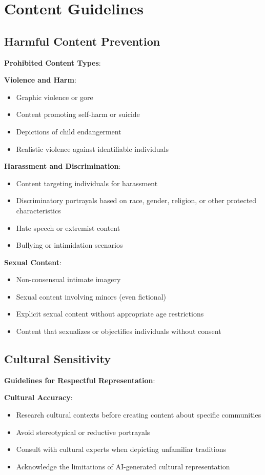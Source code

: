 \section{Content Guidelines}

\subsection{Harmful Content Prevention}
\textbf{Prohibited Content Types}:

\textbf{Violence and Harm}:
\begin{itemize}
\item Graphic violence or gore
\item Content promoting self-harm or suicide
\item Depictions of child endangerment
\item Realistic violence against identifiable individuals
\end{itemize}

\textbf{Harassment and Discrimination}:
\begin{itemize}
\item Content targeting individuals for harassment
\item Discriminatory portrayals based on race, gender, religion, or other protected characteristics
\item Hate speech or extremist content
\item Bullying or intimidation scenarios
\end{itemize}

\textbf{Sexual Content}:
\begin{itemize}
\item Non-consensual intimate imagery
\item Sexual content involving minors (even fictional)
\item Explicit sexual content without appropriate age restrictions
\item Content that sexualizes or objectifies individuals without consent
\end{itemize}

\subsection{Cultural Sensitivity}
\textbf{Guidelines for Respectful Representation}:

\textbf{Cultural Accuracy}:
\begin{itemize}
\item Research cultural contexts before creating content about specific communities
\item Avoid stereotypical or reductive portrayals
\item Consult with cultural experts when depicting unfamiliar traditions
\item Acknowledge the limitations of AI-generated cultural representation
\end{itemize}

